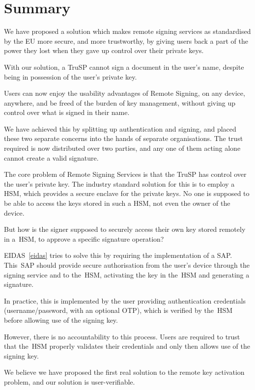 \chapter*{Summary}
We have proposed a solution which makes remote signing services as standardised by the \gls{EU} more secure,
and more trustworthy,
by giving users back a part of the power they lost when they gave up control over their private keys.

With our solution,
a \gls{TruSP} cannot sign a document in the user's name,
despite being in possession of the user's private key.

Users can now enjoy the usability advantages of Remote Signing,
on any device, anywhere,
and be freed of the burden of key management,
without giving up control over what is signed in their name.

We have achieved this by splitting up authentication and signing,
and placed these two separate concerns into the hands of separate organisations.
The trust required is now distributed over two parties,
and any one of them acting alone cannot create a valid signature.

The core problem of Remote Signing Services is that the \gls{TruSP} has control over the user's private key.
The industry standard solution for this is to employ a \gls{HSM},
which provides a secure enclave for the private keys.
No one is supposed to be able to access the keys stored in such a \gls{HSM},
not even the owner of the device.

But how is the signer supposed to securely access their own key stored remotely in a~\gls{HSM},
to approve a specific signature operation?

EIDAS~\ref{eidas} tries to solve this by requiring the implementation of a \gls{SAP}.
This~\gls{SAP} should provide secure authorisation from the user's device through the signing service and to the~\gls{HSM},
activating the key in the~\gls{HSM} and generating a signature.

In practice,
this is implemented by the user providing authentication credentials (username/password, with an optional \gls{OTP}),
which is verified by the~\gls{HSM} before allowing use of the signing key.

However, there is no accountability to this process.
Users are required to trust that the~\gls{HSM} properly validates their credentials and only then
allows use of the signing key.

We believe we have proposed the first real solution to the remote key activation problem,
and our solution is user-verifiable.


